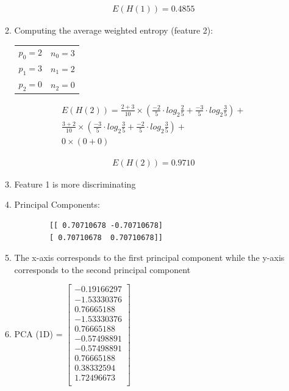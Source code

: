 \documentclass[12pt]{article}
\begin{document}
\begin{enumerate}
\begin{enumerate}
		\begin{equation}
			\begin{split}
				E(H(1)) = 0.4855
			\end{split}
		\end{equation}

	\newpage
	\item Computing the average weighted entropy (feature 2):\\
	
		\begin{tabular}{ c c}
			$p_0 = 2$ & $n_0 = 3$\\ 
			$p_1 = 3$ & $n_1 = 2$\\  
			$p_2 = 0$ & $n_2 = 0$    
		\end{tabular}
		
		
		\begin{equation}
			\begin{split}
				E(H(2)) = \frac {2+3}{10} \times (\frac{-2}{5} \cdot log_2 \frac{2}{5} + \frac{-3}{5} \cdot log_2 \frac{3}{5}) +\\
				\frac {3+2}{10} \times (\frac{-3}{5} \cdot log_2 \frac{3}{5} + \frac{-2}{5} \cdot log_2 \frac{3}{5}) +\\
				0 \times (0 + 0)
			\end{split}
		\end{equation}
		
		\begin{equation}
			\begin{split}
				E(H(2)) = 0.9710
			\end{split}
		\end{equation}

	\item Feature 1 is more discriminating
	
	\item Principal Components: \begin{verbatim}
		[[ 0.70710678 -0.70710678]
		[ 0.70710678  0.70710678]]
	\end{verbatim}

	\item The x-axis corresponds to the first principal component while the y-axis corresponds to the second principal component
	
	\item 

		PCA (1D) = 
		$
		 \begin{bmatrix}
			-0.19166297\\
			-1.53330376\\	
			0.76665188\\
			-1.53330376\\
			0.76665188\\
			-0.57498891\\
			-0.57498891\\
			0.76665188\\
			0.38332594\\
			1.72496673\\
		\end{bmatrix}
		$


\end{enumerate}
\end{enumerate}
\end{document}

